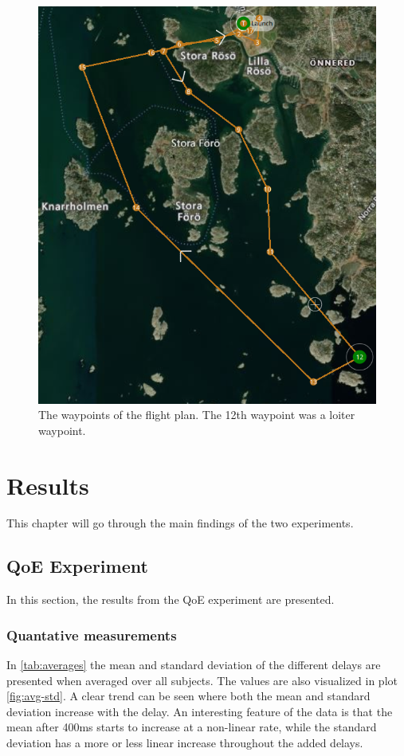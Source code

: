 \documentclass[nofilelist]{cslthse-msc}
\begin{document}
\begin{figure}[!hbt]
   \centering
   \includegraphics[scale=0.4]{images/flight-plan.png} 
   \caption{The waypoints of the flight plan. The 12th waypoint was a loiter waypoint.}
   \label{fig:flight-plan}
\end{figure}

\chapter{Results}
This chapter will go through the main findings of the two experiments.

\section{QoE Experiment}
In this section, the results from the QoE experiment are presented.  

\subsection{Quantative measurements}
In \ref{tab:averages} the mean and standard deviation of the different delays are presented when averaged over all subjects. The values are also visualized in plot \ref{fig:avg-std}. A clear trend can be seen where both the mean and standard deviation increase with the delay. An interesting feature of the data is that the mean after 400ms starts to increase at a non-linear rate, while the standard deviation has a more or less linear increase throughout the added delays.
\end{document}
